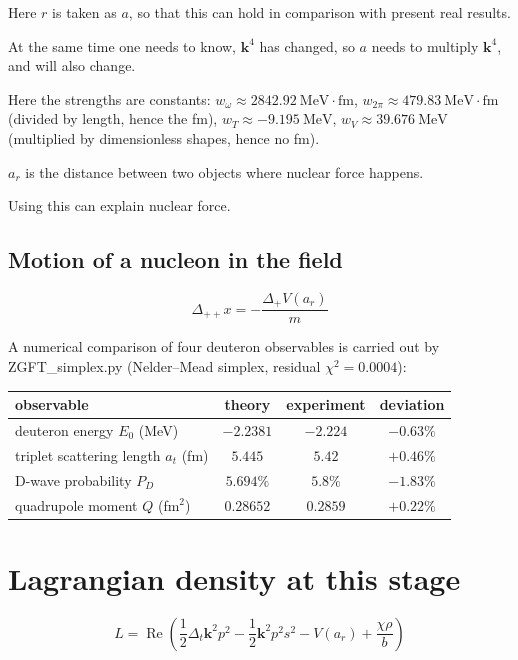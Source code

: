 \documentclass[UTF8]{article}
\begin{document}
Here \(r\) is taken as \(a\), so that this can hold in comparison with present real results.

At the same time one needs to know, \(\mathbf{k}^4\) has changed, so \(a\) needs to multiply \(\mathbf{k}^4\), and will also change.

Here the strengths are constants: \(w_{\omega}\approx 2842.92\ \mathrm{MeV\cdot fm}\), \(w_{2\pi}\approx 479.83\ \mathrm{MeV\cdot fm}\) (divided by length, hence the fm), \(w_T\approx -9.195\ \mathrm{MeV}\), \(w_V\approx 39.676\ \mathrm{MeV}\) (multiplied by dimensionless shapes, hence no fm).

\(a_r\) is the distance between two objects where nuclear force happens.

Using this can explain nuclear force.


\subsection{Motion of a nucleon in the field}

\begin{equation}
\Delta_{++}x=-\frac{\Delta_+V(a_r)}{m}
\end{equation}


A numerical comparison of four deuteron observables is carried out by ZGFT\_simplex.py
(Nelder--Mead simplex, residual $\chi^2=0.0004$):

\begin{center}
\begin{tabular}{lccc}
\hline
observable & theory & experiment & deviation \\
\hline
deuteron energy $E_0$ (MeV) & $-2.2381$ & $-2.224$ & $-0.63\%$ \\
triplet scattering length $a_t$ (fm) & $5.445$ & $5.42$ & $+0.46\%$ \\
D-wave probability $P_D$ & $5.694\%$ & $5.8\%$ & $-1.83\%$ \\
quadrupole moment $Q$ (fm$^2$) & $0.28652$ & $0.2859$ & $+0.22\%$ \\
\hline
\end{tabular}
\end{center}

\section{Lagrangian density at this stage}

\begin{equation}
L=\operatorname{Re}\left(\frac{1}{2}\Delta_t\mathbf{k}^2p^2-\frac{1}{2}\mathbf{k}^2p^2s^2-V(a_r)+\frac{\chi\rho}{b}\right)
\end{equation}
\end{document}
